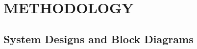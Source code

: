 \documentclass[12pt,a4paper]{report}
\begin{document}
	
	
	
	
	
	
	
	\chapter{METHODOLOGY}
	
	\section{System Designs and Block Diagrams}
	
	
	
\end{document}
